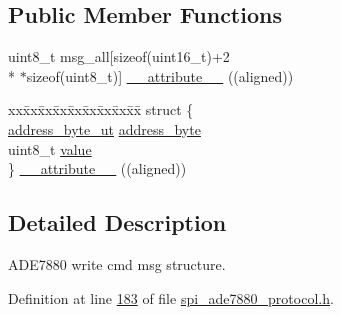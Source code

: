 \subsection*{Public Member Functions}
\begin{DoxyCompactItemize}
\item 
uint8\-\_\-t msg\-\_\-all\mbox{[}sizeof(uint16\-\_\-t)+2 \\*
$\ast$sizeof(uint8\-\_\-t)\mbox{]} \hyperlink{a00012_a749d7c90c760fe3888e7264ad7c01173}{\-\_\-\-\_\-attribute\-\_\-\-\_\-} ((aligned))
\item 
\begin{tabbing}
xx\=xx\=xx\=xx\=xx\=xx\=xx\=xx\=xx\=\kill
struct \{\\
\>\hyperlink{a00011}{address\_byte\_ut} \hyperlink{a00012_af6a65bac733ea3e9b1d24b065163d49a}{address\_byte}\\
\>uint8\_t \hyperlink{a00012_a638e4503e0ae6ce655b7ad2e17e8f0ad}{value}\\
\} \hyperlink{a00012_a06defa53e45f61308c05f99b41324fa4}{\_\_attribute\_\_} ((aligned))\\

\end{tabbing}\end{DoxyCompactItemize}


\subsection{Detailed Description}
A\-D\-E7880 write cmd msg structure. 

Definition at line \hyperlink{a00041_source_l00183}{183} of file \hyperlink{a00041_source}{spi\-\_\-ade7880\-\_\-protocol.\-h}.



